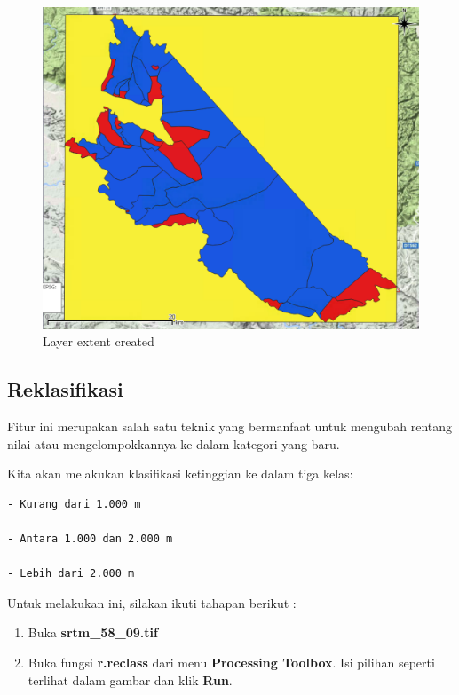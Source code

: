 \documentclass[]{book}
\begin{document}
\begin{figure}

{\centering \includegraphics[width=0.7\linewidth]{images/04/fig23} 

}

\caption{Layer extent created}\label{fig:fig1423}
\end{figure}

\hypertarget{reklasifikasi}{%
\subsection{Reklasifikasi}\label{reklasifikasi}}

Fitur ini merupakan salah satu teknik yang bermanfaat untuk mengubah rentang nilai atau mengelompokkannya ke dalam kategori yang baru.

Kita akan melakukan klasifikasi ketinggian ke dalam tiga kelas:

\begin{verbatim}
- Kurang dari 1.000 m

- Antara 1.000 dan 2.000 m

- Lebih dari 2.000 m
\end{verbatim}

Untuk melakukan ini, silakan ikuti tahapan berikut :

\begin{enumerate}
\def\labelenumi{\arabic{enumi}.}
\item
  Buka \textbf{srtm\_58\_09.tif}
\item
  Buka fungsi \textbf{r.reclass} dari menu \textbf{Processing Toolbox}. Isi pilihan seperti terlihat dalam gambar dan klik \textbf{Run}.
\end{enumerate}
\end{document}
